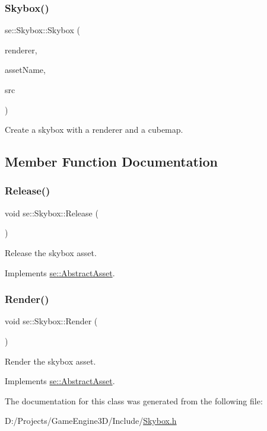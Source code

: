 \subsubsection{\texorpdfstring{Skybox()}{Skybox()}}
{\footnotesize\ttfamily se\+::\+Skybox\+::\+Skybox (\begin{DoxyParamCaption}\item[{\mbox{\hyperlink{classse_1_1_abstract_renderer}{Abstract\+Renderer}} $\ast$}]{renderer,  }\item[{const std\+::string \&}]{asset\+Name,  }\item[{const std\+::string \&}]{src }\end{DoxyParamCaption})}

Create a skybox with a renderer and a cubemap. 

\subsection{Member Function Documentation}
\mbox{\label{classse_1_1_skybox_a86c5fb357bbe7c58099d3b85f0df1408}} 
\subsubsection{\texorpdfstring{Release()}{Release()}}
{\footnotesize\ttfamily void se\+::\+Skybox\+::\+Release (\begin{DoxyParamCaption}{ }\end{DoxyParamCaption})\hspace{0.3cm}{\ttfamily [virtual]}}

Release the skybox asset. 

Implements \mbox{\hyperlink{classse_1_1_abstract_asset_aea97e36f647efdb07a801b6fc468388d}{se\+::\+Abstract\+Asset}}.

\mbox{\label{classse_1_1_skybox_a2c33944b8f383c4eda21ae1c60e3025a}} 
\subsubsection{\texorpdfstring{Render()}{Render()}}
{\footnotesize\ttfamily void se\+::\+Skybox\+::\+Render (\begin{DoxyParamCaption}{ }\end{DoxyParamCaption})\hspace{0.3cm}{\ttfamily [virtual]}}

Render the skybox asset. 

Implements \mbox{\hyperlink{classse_1_1_abstract_asset_a2addad2ca18a3ffbcbe1e80afa0ad56c}{se\+::\+Abstract\+Asset}}.



The documentation for this class was generated from the following file\+:\begin{DoxyCompactItemize}
\item 
D\+:/\+Projects/\+Game\+Engine3\+D/\+Include/\mbox{\hyperlink{_skybox_8h}{Skybox.\+h}}\end{DoxyCompactItemize}
